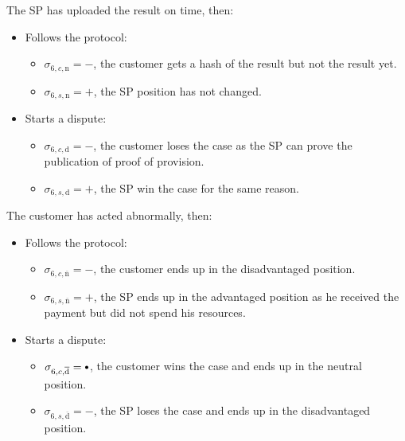 \documentclass{ieeeaccess}
\newcommand\sbullet[1][.75]{\mathbin{\ThisStyle{\vcenter{\hbox{%
  \scalebox{#1}{$\SavedStyle\bullet$}}}}}%
}
\begin{document}
The SP has uploaded the result on time, then:

\begin{itemize}
\item
  Follows the protocol:

  \begin{itemize}
  
  \item
    \(\sigma_{6, c, \mathrm{n}} = -\), the customer gets a hash of the result but not the result yet.
  \item
    \(\sigma_{6, s, \mathrm{n}} = +\), the SP position has not changed.
  \end{itemize}
\item
  Starts a dispute:

  \begin{itemize}
  
  \item
    \(\sigma_{6, c, \mathrm{d}} = -\), the customer loses the case as the SP can prove the publication of proof of provision. 
  \item
    \(\sigma_{6, s, \mathrm{d}} = +\), the SP win the case for the same reason.
  \end{itemize}
\end{itemize}

The customer has acted abnormally, then:

\begin{itemize}
\item
  Follows the protocol:

  \begin{itemize}
  
  \item
    \(\sigma_{6, c, \overline{\mathrm{n}}} = -\), the customer ends up in the disadvantaged position.
  \item
    \(\sigma_{6, s, \overline{\mathrm{n}}} = +\), the SP ends up in the advantaged position as he received the payment but did not spend his resources.
  \end{itemize}
\item
  Starts a dispute:

  \begin{itemize}
  
  \item
    \(\sigma_{6, c, \overline{\mathrm{d}}} = \sbullet\), the customer wins the case and ends up in the neutral position.
  \item
    \(\sigma_{6, s, \overline{\mathrm{d}}} = -\), the SP loses the case and ends up in the disadvantaged position.
  \end{itemize}
\end{itemize}
\end{document}
